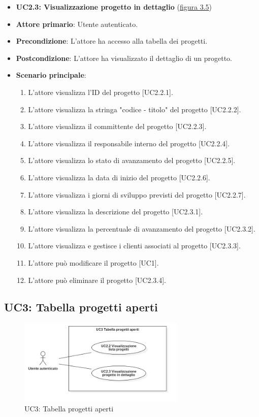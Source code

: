 \begin{itemize}
\item \textbf{UC2.3: Visualizzazione progetto in dettaglio} ({\hyperref[fig:UC2.3]{figura 3.5}})
\item \textbf{Attore primario}: Utente autenticato.
\item \textbf{Precondizione}: L'attore ha accesso alla tabella dei progetti.
\item \textbf{Postcondizione}: L'attore ha visualizzato il dettaglio di un progetto.
\item \textbf{Scenario principale}: 
\begin{enumerate}
\item L'attore visualizza l'ID del progetto [UC2.2.1].
\item L'attore visualizza la stringa "codice - titolo" del progetto [UC2.2.2].
\item L'attore visualizza il committente del progetto [UC2.2.3].
\item L'attore visualizza il responsabile interno del progetto [UC2.2.4].
\item L'attore visualizza lo stato di avanzamento del progetto [UC2.2.5].
\item L'attore visualizza la data di inizio del progetto [UC2.2.6].
\item L'attore visualizza i giorni di sviluppo previsti del progetto [UC2.2.7].
\item L'attore visualizza la descrizione del progetto [UC2.3.1].
\item L'attore visualizza la percentuale di avanzamento del progetto [UC2.3.2].
\item L'attore visualizza e gestisce i clienti associati al progetto [UC2.3.3].
\item L'attore può modificare il progetto [UC1].
\item L'attore può eliminare il progetto [UC2.3.4].
\end{enumerate}
\end{itemize}

\subsection{UC3: Tabella progetti aperti}
\begin{figure}[!h]
\centering
\includegraphics[width=300px]{../images/UC/.jpeg/UC3.0-tabellaProgettiAperti.jpg}
\caption{UC3: Tabella progetti aperti}
\label{fig:UC3}
\end{figure}

